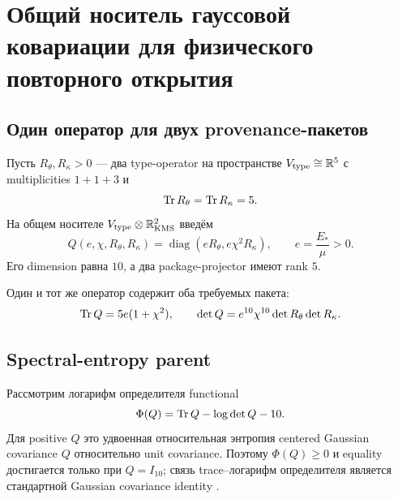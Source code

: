\chapter{Общий носитель гауссовой ковариации для физического повторного открытия}
\label{ch:v9-physical-reopening-common-origin-carrier}

\section{Один оператор для двух provenance-пакетов}

Пусть $R_\theta,R_\kappa>0$ --- два type-operator на пространстве
$V_{\rm type}\cong\mathbb R^5$ с multiplicities $1+1+3$ и
\begin{equation}
 \operatorname{Tr} R_\theta=\operatorname{Tr} R_\kappa=5.
 \label{eq:v9-common-origin-shape-normalization}
\end{equation}
На общем носителе $V_{\rm type}\otimes\mathbb R^2_{\rm KMS}$ введём
\begin{equation}
 Q(e,\chi,R_\theta,R_\kappa)
 =\operatorname{diag}(eR_\theta,e\chi^2R_\kappa),
 \qquad e=\frac{E_*}{\mu}>0.
 \label{eq:v9-common-origin-operator}
\end{equation}
Его dimension равна $10$, а два package-projector имеют rank $5$.

Один и тот же оператор содержит оба требуемых пакета:
\begin{equation}
 \operatorname{Tr} Q=5e(1+\chi^2),
 \qquad
 \det Q=e^{10}\chi^{10}\det R_\theta\det R_\kappa.
 \label{eq:v9-common-origin-trace-determinant}
\end{equation}

\section{Spectral-entropy parent}

Рассмотрим логарифм определителя functional
\begin{equation}
 \Phi(Q)=\operatorname{Tr} Q-\log\det Q-10.
 \label{eq:v9-common-origin-spectral-entropy}
\end{equation}
Для positive $Q$ это удвоенная относительная энтропия centered Gaussian
covariance $Q$ относительно unit covariance. Поэтому
$\Phi(Q)\geq0$ и equality достигается только при $Q=I_{10}$; связь
trace--логарифм определителя является стандартной Gaussian covariance identity
\cite{v9-common-origin-lami2017}.

